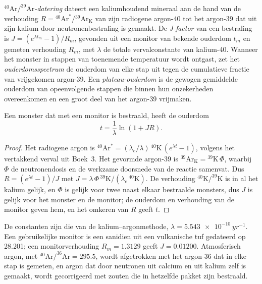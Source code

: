 \begin{definition}
\label{def:b3:advanced-geochronology:arar}
\emph{$^{40}\mathrm{Ar}/^{39}\mathrm{Ar}$-datering}
dateert een kaliumhoudend mineraal aan de hand van de verhouding $R =
{}^{40}\mathrm{Ar}^*/{}^{39}\mathrm{Ar}_{\mathrm K}$ van zijn radiogene argon-40
tot het argon-39 dat uit zijn kalium door neutronenbestraling is gemaakt. De
\emph{J-factor} van een bestraling is $J = (e^{\lambda
t_m} - 1)/R_m$, gevonden uit een monitor van bekende ouderdom $t_m$ en gemeten
verhouding $R_m$, met $\lambda$ de totale vervalconstante van kalium-40. Wanneer het monster
in stappen van toenemende temperatuur wordt ontgast, zet het
\emph{ouderdomsspectrum} de ouderdom van elke stap uit tegen de
cumulatieve fractie van vrijgekomen argon-39. Een
\emph{plateau-ouderdom} is de gewogen gemiddelde ouderdom van opeenvolgende stappen die
binnen hun onzekerheden overeenkomen en een groot deel van het argon-39 vrijmaken.
\end{definition}

\begin{theorem}\label{thm:b3:advanced-geochronology:arar}
Een monster dat met een monitor is bestraald, heeft de ouderdom
\[
t = \frac1\lambda\ln(1 + JR).
\]
\end{theorem}

\begin{proof}
Het radiogene argon is $^{40}\mathrm{Ar}^* = (\lambda_e/\lambda)\,
{}^{40}\mathrm{K}\,(e^{\lambda t} - 1)$, volgens het vertakkend verval uit
Boek~3. Het gevormde argon-39 is $^{39}\mathrm{Ar}_{\mathrm K} =
{}^{39}\mathrm{K}\,\Phi$, waarbij $\Phi$ de neutronendosis en de
werkzame doorsnede van de reactie samenvat. Dus $R = (e^{\lambda t} - 1)/J$ met $J =
\lambda\,\Phi\,{}^{39}\mathrm{K}/(\lambda_e\,{}^{40}\mathrm{K})$. De verhouding
$^{40}\mathrm{K}/^{39}\mathrm{K}$ is in al het kalium gelijk, en $\Phi$ is
gelijk voor twee naast elkaar bestraalde monsters, dus $J$ is gelijk voor het monster
en de monitor; de ouderdom en verhouding van de monitor geven hem, en het omkeren van $R$ geeft
$t$.
\end{proof}

De constanten zijn die van de kalium--argonmethode, $\lambda =
\qty{5.543e-10}{yr^{-1}}$. Een gebruikelijke monitor is een sanidien uit een vulkanische tuf
gedateerd op \qty{28.201}{\Ma}; een monitorverhouding $R_m = 1.3129$ geeft $J =
0.01200$. Atmosferisch argon, met $^{40}\mathrm{Ar}/^{36}\mathrm{Ar} = 295.5$,
wordt afgetrokken met het argon-36 dat in elke stap is gemeten, en argon dat door
neutronen uit calcium en uit kalium zelf is gemaakt, wordt gecorrigeerd met zouten die
in hetzelfde pakket zijn bestraald.

